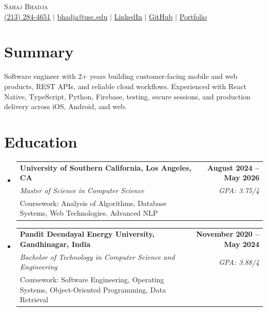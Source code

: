 \documentclass[letterpaper,10pt]{article}
\makeatletter
\newcommand{\resumeEduSubheading}[5]{\vspace{-1pt}\item\begin{tabular*}{1.0\textwidth}[t]{l@{\extracolsep{\fill}}r}\textbf{#1} & \textbf{\small #2} \\\textit{\small #3} & \textit{\small #4} \\\small #5 & \\\end{tabular*}\vspace{-4pt}}
\newcommand{\resumeSubHeadingListStart}{\begin{itemize}[leftmargin=0.0in,label={}]}
\newcommand{\resumeSubHeadingListEnd}{\end{itemize}}
\makeatother
\begin{document}
\begin{center}
  {\Huge \scshape Sahaj Bhadja} \\ \vspace{1pt}
  \small \href{tel:2132844651}{(213) 284-4651} $|$ \href{mailto:bhadja@usc.edu}{bhadja@usc.edu} $|$
  \href{https://www.linkedin.com/in/sahaj-bhadja/}{LinkedIn} $|$ \href{https://github.com/sahaj-bhadja}{GitHub} $|$ \href{https://sahaj-bhadja.github.io/}{Portfolio}
\end{center}
\vspace{-13pt}

\section{Summary}
\small Software engineer with 2+ years building customer-facing mobile and web products, REST APIs, and reliable cloud workflows. Experienced with React Native, TypeScript, Python, Firebase, testing, secure sessions, and production delivery across iOS, Android, and web.

\section{Education}
\resumeSubHeadingListStart
  \resumeEduSubheading{University of Southern California, Los Angeles, CA}{August 2024 -- May 2026}{Master of Science in Computer Science}{GPA: 3.75/4}{Coursework: Analysis of Algorithms, Database Systems, Web Technologies, Advanced NLP}
  \vspace{2pt}
  \resumeEduSubheading{Pandit Deendayal Energy University, Gandhinagar, India}{November 2020 -- May 2024}{Bachelor of Technology in Computer Science and Engineering}{GPA: 3.88/4}{Coursework: Software Engineering, Operating Systems, Object-Oriented Programming, Data Retrieval}
\resumeSubHeadingListEnd
\end{document}
